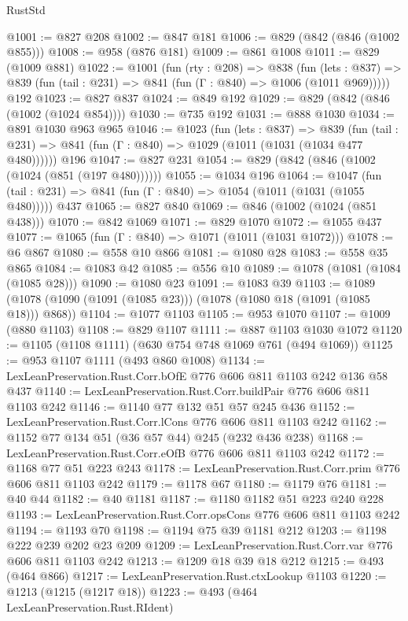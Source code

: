 \begin{lexlean}{RustStd}
\begin{coremodule}
@1001 := @827 @208
@1002 := @847 @181
@1006 := @829 (@842 (@846 (@1002 @855)))
@1008 := @958 (@876 @181)
@1009 := @861 @1008
@1011 := @829 (@1009 @881)
@1022 := @1001
    (fun (rty : @208) =>
    @838
      (fun (lets : @837) =>
      @839 (fun (tail : @231) => @841 (fun (Γ : @840) => @1006 (@1011 @969)))))
    @192
@1023 := @827 @837
@1024 := @849 @192
@1029 := @829 (@842 (@846 (@1002 (@1024 @854))))
@1030 := @735 @192
@1031 := @888 @1030
@1034 := @891 @1030 @963 @965
@1046 := @1023
    (fun (lets : @837) =>
    @839 (fun (tail : @231) => @841 (fun (Γ : @840) => @1029 (@1011 (@1031 (@1034 @477 @480))))))
    @196
@1047 := @827 @231
@1054 := @829 (@842 (@846 (@1002 (@1024 (@851 (@197 @480))))))
@1055 := @1034 @196
@1064 := @1047
    (fun (tail : @231) => @841 (fun (Γ : @840) => @1054 (@1011 (@1031 (@1055 @480)))))
    @437
@1065 := @827 @840
@1069 := @846 (@1002 (@1024 (@851 @438)))
@1070 := @842 @1069
@1071 := @829 @1070
@1072 := @1055 @437
@1077 := @1065 (fun (Γ : @840) => @1071 (@1011 (@1031 @1072)))
@1078 := @6 @867
@1080 := @558 @10 @866
@1081 := @1080 @28
@1083 := @558 @35 @865
@1084 := @1083 @42
@1085 := @556 @10
@1089 := @1078 (@1081 (@1084 (@1085 @28)))
@1090 := @1080 @23
@1091 := @1083 @39
@1103 := @1089 (@1078 (@1090 (@1091 (@1085 @23))) (@1078 (@1080 @18 (@1091 (@1085 @18))) @868))
@1104 := @1077 @1103
@1105 := @953 @1070
@1107 := @1009 (@880 @1103)
@1108 := @829 @1107
@1111 := @887 @1103 @1030 @1072
@1120 := @1105 (@1108 @1111) (@630 @754 @748 @1069 @761 (@494 @1069))
@1125 := @953 @1107 @1111 (@493 @860 @1008)
@1134 := LexLeanPreservation.Rust.Corr.bOfE @776 @606 @811 @1103 @242 @136 @58 @437
@1140 := LexLeanPreservation.Rust.Corr.buildPair @776 @606 @811 @1103 @242
@1146 := @1140 @77 @132 @51 @57 @245 @436
@1152 := LexLeanPreservation.Rust.Corr.lCons @776 @606 @811 @1103 @242
@1162 := @1152 @77 @134 @51 (@36 @57 @44) @245 (@232 @436 @238)
@1168 := LexLeanPreservation.Rust.Corr.eOfB @776 @606 @811 @1103 @242
@1172 := @1168 @77 @51 @223 @243
@1178 := LexLeanPreservation.Rust.Corr.prim @776 @606 @811 @1103 @242
@1179 := @1178 @67
@1180 := @1179 @76
@1181 := @40 @44
@1182 := @40 @1181
@1187 := @1180 @1182 @51 @223 @240 @228
@1193 := LexLeanPreservation.Rust.Corr.opsCons @776 @606 @811 @1103 @242
@1194 := @1193 @70
@1198 := @1194 @75 @39 @1181 @212
@1203 := @1198 @222 @239 @202 @23 @209
@1209 := LexLeanPreservation.Rust.Corr.var @776 @606 @811 @1103 @242
@1213 := @1209 @18 @39 @18 @212
@1215 := @493 (@464 @866)
@1217 := LexLeanPreservation.Rust.ctxLookup @1103
@1220 := @1213 (@1215 (@1217 @18))
@1223 := @493 (@464 LexLeanPreservation.Rust.RIdent)

\end{coremodule}
\end{lexlean}
